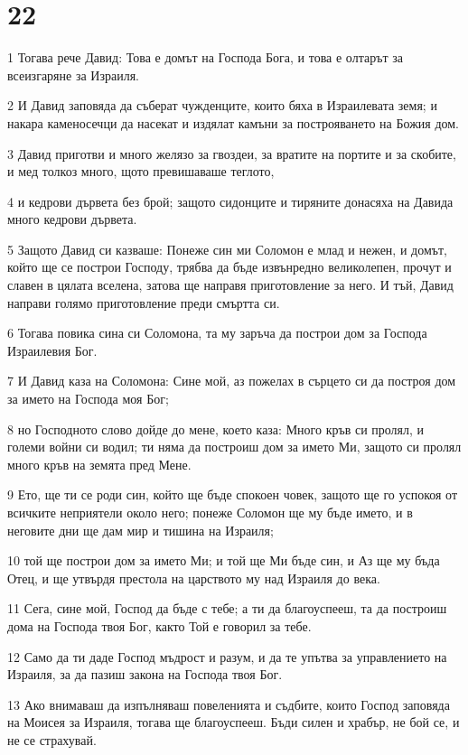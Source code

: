 \chapter{22}

\par 1 Тогава рече Давид: Това е домът на Господа Бога, и това е олтарът за всеизгаряне за Израиля.
\par 2 И Давид заповяда да съберат чужденците, които бяха в Израилевата земя; и накара каменосечци да насекат и издялат камъни за построяването на Божия дом.
\par 3 Давид приготви и много желязо за гвоздеи, за вратите на портите и за скобите, и мед толкоз много, щото превишаваше теглото,
\par 4 и кедрови дървета без брой; защото сидонците и тиряните донасяха на Давида много кедрови дървета.
\par 5 Защото Давид си казваше: Понеже син ми Соломон е млад и нежен, и домът, който ще се построи Господу, трябва да бъде извънредно великолепен, прочут и славен в цялата вселена, затова ще направя приготовление за него. И тъй, Давид направи голямо приготовление преди смъртта си.
\par 6 Тогава повика сина си Соломона, та му заръча да построи дом за Господа Израилевия Бог.
\par 7 И Давид каза на Соломона: Сине мой, аз пожелах в сърцето си да построя дом за името на Господа моя Бог;
\par 8 но Господното слово дойде до мене, което каза: Много кръв си пролял, и големи войни си водил; ти няма да построиш дом за името Ми, защото си пролял много кръв на земята пред Мене.
\par 9 Ето, ще ти се роди син, който ще бъде спокоен човек, защото ще го успокоя от всичките неприятели около него; понеже Соломон ще му бъде името, и в неговите дни ще дам мир и тишина на Израиля;
\par 10 той ще построи дом за името Ми; и той ще Ми бъде син, и Аз ще му бъда Отец, и ще утвърдя престола на царството му над Израиля до века.
\par 11 Сега, сине мой, Господ да бъде с тебе; а ти да благоуспееш, та да построиш дома на Господа твоя Бог, както Той е говорил за тебе.
\par 12 Само да ти даде Господ мъдрост и разум, и да те упътва за управлението на Израиля, за да пазиш закона на Господа твоя Бог.
\par 13 Ако внимаваш да изпълняваш повеленията и съдбите, които Господ заповяда на Моисея за Израиля, тогава ще благоуспееш. Бъди силен и храбър, не бой се, и не се страхувай.
